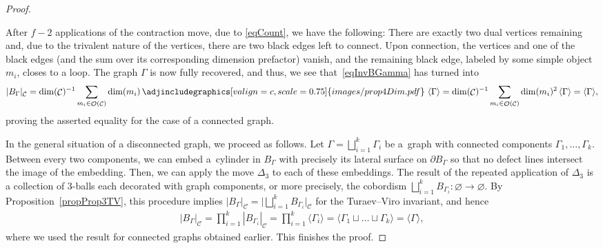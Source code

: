 \documentclass[10pt,a4paper]{amsart}
\DeclareMathOperator{\calc}{\mathcal{C}}
\DeclareMathOperator{\calo}{\mathcal{O}}
\numberwithin{equation}{section}
\theoremstyle{definition}
\begin{document}
\begin{proof}
\begin{enumerate}
 \end{enumerate}
 After $f-2$ applications of the contraction move, due to \eqref{eqCount}, we have the following: There are exactly two dual vertices remaining and, due to the trivalent nature of the vertices, there are two black edges left to connect. Upon connection, the vertices and one of the black edges (and the sum over its corresponding dimension prefactor) vanish, and the remaining black edge, labeled by some simple object~$m_i$, closes to a loop. The graph $\Gamma$ is now fully recovered, and thus, we see that~\eqref{eqInvBGamma} has turned into
 \begin{align*}
 |B_{\Gamma}|_{\calc} = \dim(\calc)^{-1}\sum_{m_i \in \calo(\calc)} \dim(m_i) \, \adjincludegraphics[valign=c, scale = 0.75]{images/prop4Dim.pdf} \, \, \langle \Gamma \rangle = \dim(\calc)^{-1}\sum_{m_i \in \calo(\calc)} \dim(m_i)^2 \, \langle \Gamma \rangle = \langle \Gamma \rangle,
 \end{align*}
 proving the asserted equality for the case of a connected graph.

 In the general situation of a disconnected graph, we proceed as follows. Let $\Gamma = \bigsqcup_{i = 1}^k \Gamma_i$ be a~graph with connected components $\Gamma_1, \dots, \Gamma_k$. Between every two components, we can embed a~cylinder in $B_{\Gamma}$ with precisely its lateral surface on $\partial B_{\Gamma}$ so that no defect lines intersect the image of the embedding. Then, we can apply the move $\Delta_3$ to each of these embeddings. The result of the repeated application of $\Delta_3$ is a collection of 3-balls each decorated with graph components, or more precisely, the cobordism $\bigsqcup_{i = 1}^k B_{\Gamma_i}\colon \varnothing \rightarrow \varnothing$. By Proposition~\ref{propProp3TV}, this procedure implies $|B_{\Gamma}|_{\calc} = \bigl|\bigsqcup_{i = 1}^k B_{\Gamma_i}\bigr|_{\calc}$ for the Turaev--Viro invariant, and hence
 \begin{align*}
 |B_{\Gamma}|_{\calc} = \prod_{i = 1}^k|B_{\Gamma_i}|_{\calc} = \prod_{i = 1}^k\langle \Gamma_i\rangle = \langle \Gamma_1 \sqcup \dots \sqcup \Gamma_k \rangle = \langle \Gamma \rangle,
 \end{align*}
 where we used the result for connected graphs obtained earlier. This finishes the proof.
\end{proof}
\end{document}
